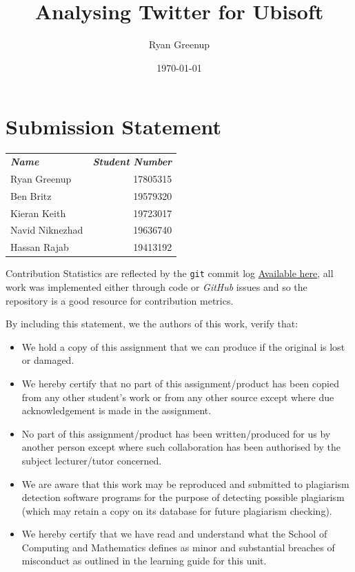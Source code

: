 \documentclass[11pt]{article}
\author{Ryan Greenup}
\date{\today}
\title{Analysing Twitter for Ubisoft}
\begin{document}
\maketitle
\tableofcontents



\section{Submission Statement}
\label{sec:org0825267}

\begin{center}
\begin{tabular}{lr}
\textbf{\emph{Name}} & \textbf{\emph{Student Number}}\\
Ryan Greenup & 17805315\\
Ben Britz & 19579320\\
Kieran Keith & 19723017\\
Navid Niknezhad & 19636740\\
Hassan Rajab & 19413192\\
\end{tabular}
\end{center}

Contribution Statistics are reflected by the \texttt{git} commit log \href{https://github.com/RyanGreenup/SWA-Project/commits/master}{Available here},
all work was implemented either through code or \emph{GitHub} issues and so the
repository is a good resource for contribution metrics.

By including this statement, we the authors of this work, verify that:

\begin{itemize}
\item We hold a copy of this assignment that we can produce if the original is lost or damaged.
\item We hereby certify that no part of this assignment/product has been copied from
any other student's work or from any other source except where due
acknowledgement is made in the assignment.
\item No part of this assignment/product has been written/produced for us by another
person except where such collaboration has been authorised by the subject
lecturer/tutor concerned.
\item We are aware that this work may be reproduced and submitted to plagiarism
detection software programs for the purpose of detecting possible plagiarism
(which may retain a copy on its database for future plagiarism checking).
\item We hereby certify that we have read and understand what the School of
Computing and Mathematics defines as minor and substantial breaches of
misconduct as outlined in the learning guide for this unit.
\end{itemize}
\end{document}
